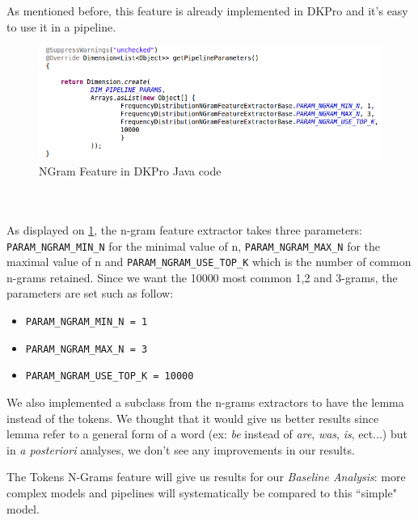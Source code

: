 As mentioned before, this feature is already implemented in DKPro and it's easy to use it in a pipeline.
\
\begin{figure}[h]
    \centering
    \includegraphics[width=1.05\textwidth]{fig/ngramfeature.png}
    \caption[Short caption]{NGram Feature in DKPro Java code}
    \label{fig:ngramfeature}
\end{figure}
\\
\\
As displayed on \ref{fig:ngramfeature}, the n-gram feature extractor takes three parameters: \texttt{PARAM\_NGRAM\_MIN\_N} for the minimal value of n, \texttt{PARAM\_NGRAM\_MAX\_N} for the maximal value of n and \texttt{PARAM\_NGRAM\_USE\_TOP\_K} which is the number of common n-grams retained.
Since we want the 10000 most common 1,2 and 3-grams, the parameters are set such as follow:

\begin{itemize}[label={}]
  \item \texttt{PARAM\_NGRAM\_MIN\_N = 1}
  \item \texttt{PARAM\_NGRAM\_MAX\_N = 3}
  \item \texttt{PARAM\_NGRAM\_USE\_TOP\_K = 10000}
\end{itemize}

We also implemented a subclass from the n-grams extractors to have the lemma instead of the tokens. We thought that it would give us better results since lemma refer to a general form of a word (ex: \emph{be} instead of \emph{are}, \emph{was}, \emph{is}, ect...) but in \emph{a posteriori} analyses, we don't see any improvements in our results.

The Tokens N-Grams feature will give us results for our \emph{Baseline Analysis}: more complex models and pipelines will systematically be compared to this ``simple" model.

